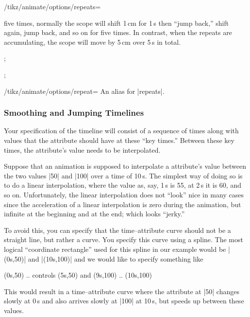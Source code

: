 \begin{key}{/tikz/animate/options/repeats=}
\begin{itemize}
    five times, normally the scope will shift 1\,cm for 1\,s then
    ``jump back,'' shift again, jump back, and so on for five
    times. In contrast, when the repeats are accumulating, the scope
    will move by 5\,cm over 5\,s in total.    
\begin{codeexample}[animation list={1,2,3,4,5}]
\tikz 
  ; 
\end{codeexample}
\begin{codeexample}[animation list={1,2,3,4,5}]
\tikz 
  ; 
\end{codeexample}
  \end{itemize}
\end{key}

\begin{key}{/tikz/animate/options/repeat=}
  An alias for |repeats|.
\end{key}


\subsubsection{Smoothing and Jumping Timelines}

\label{section-anim-smooth}

Your specification of the timeline will consist of a sequence of
times along with values that the attribute should have at these ``key
times.'' Between these key times, the attribute's value needs to be
interpolated. 
  
Suppose that an animation is supposed to interpolate a attribute's
value between the two values |50| and |100| over a time of
10\,s. The simplest way of doing so is to do a linear
interpolation, where the value as, say, 1\,s is 55, at 2\,s it is
60, and so on. Unfortunately, the linear interpolation does not
``look'' nice in many cases since the acceleration of a linear
interpolation is zero  during the animation, but infinite at the
beginning and at the end; which looks ``jerky.''

To avoid this, you can specify that the time--attribute curve should 
not be a straight line, but rather a curve. You specify this curve
using a spline. The most logical ``coordinate rectangle'' used for
this spline in our example would be |(0s,50)| and |(10s,100)| and we
would like to specify something like
\begin{codeexample}
  (0s,50) .. controls (5s,50) and (9s,100) .. (10s,100)
\end{codeexample}
This would result in a time--attribute curve where
the attribute at |50| changes slowly at 0\,s and also arrives slowly
at |100| at 10\,s, but speeds up between these values.

